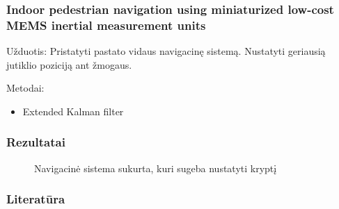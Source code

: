 \documentclass{beamer}
\begin{document}
    \begin{frame}   
        \frametitle{Indoor pedestrian navigation using miniaturized low-cost MEMS inertial measurement units \cite{yuan2014indoor}}

        Užduotis: Pristatyti pastato vidaus navigacinę sistemą. Nustatyti geriausią jutiklio poziciją ant žmogaus.

        Metodai:
        \begin{itemize}
            \item Extended Kalman filter
        \end{itemize}

    \end{frame}

    \begin{frame}
        \frametitle{Rezultatai}

        \begin{figure}[H]
            \caption{Navigacinė sistema sukurta, kuri sugeba nustatyti kryptį}
        \end{figure}
    \end{frame}

    \begin{frame}
        \frametitle{Literatūra}
        
        
        
    \end{frame}
\end{document}
